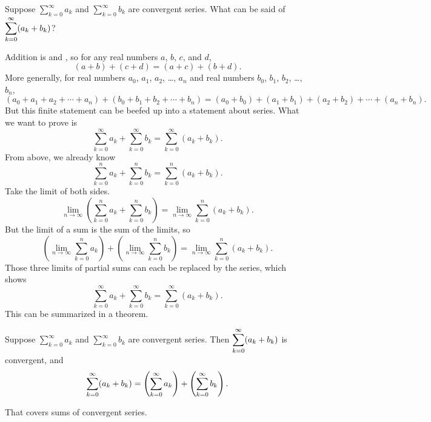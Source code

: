 Suppose $\sum_{k=0}^\infty a_k$ and $\sum_{k=0}^\infty b_k$ are
convergent series. What can be said of $\displaystyle\sum_{k=0}^\infty
(a_k+b_k)$?

Addition is  and , so for any real numbers $a$, $b$,
$c$, and $d$,
$$
(a+b)+(c+d) = (a+c) + (b+d).
$$
More generally, for real numbers $a_0$, $a_1$, $a_2$, \ldots, $a_n$ and real numbers
$b_0$, $b_1$, $b_2$, \ldots, $b_n$,
$$
(a_0 + a_1 + a_2 + \cdots + a_n)+(b_0 + b_1 + b_2 + \cdots + b_n) = (a_0 + b_0) + (a_1 + b_1) + (a_2 + b_2) + \cdots + (a_n + b_n).
$$
But this finite statement can be beefed up into a statement about series.  What we want to prove is
$$
\sum_{k=0}^\infty a_k + \sum_{k=0}^\infty b_k = \sum_{k=0}^\infty \left( a_k + b_k \right).
$$
From above, we already know
$$
\sum_{k=0}^n a_k + \sum_{k=0}^n b_k = \sum_{k=0}^n \left( a_k + b_k \right).
$$
Take the limit of both sides.
$$
\lim_{n \to \infty} \left( \sum_{k=0}^n a_k + \sum_{k=0}^n b_k \right) = \lim_{n \to \infty} \sum_{k=0}^n \left( a_k + b_k \right).
$$
But the limit of a sum is the sum of the limits, so
$$
\left( \lim_{n \to \infty} \sum_{k=0}^n a_k \right) + \left( \lim_{n \to \infty} \sum_{k=0}^n b_k \right) = \lim_{n \to \infty} \sum_{k=0}^n \left( a_k + b_k \right).
$$
Those three limits of partial sums can each be replaced by the series, which shows
$$
\sum_{k=0}^\infty a_k + \sum_{k=0}^\infty b_k = \sum_{k=0}^\infty \left( a_k + b_k \right).
$$
This can be summarized in a theorem.
\begin{theorem} \relax\label{thm:series-are-linear}
  Suppose $\sum_{k=0}^\infty a_k$ and $\sum_{k=0}^\infty b_k$ are
  convergent series. Then $\displaystyle\sum_{k=0}^\infty (a_k+b_k)$ is
  convergent, and
$$\displaystyle\sum_{k=0}^\infty (a_k+b_k)=\left( \sum_{k=0}^\infty a_k \right)+\left(\sum_{k=0}^\infty b_k\right).$$
\end{theorem}
That covers sums of convergent series.

